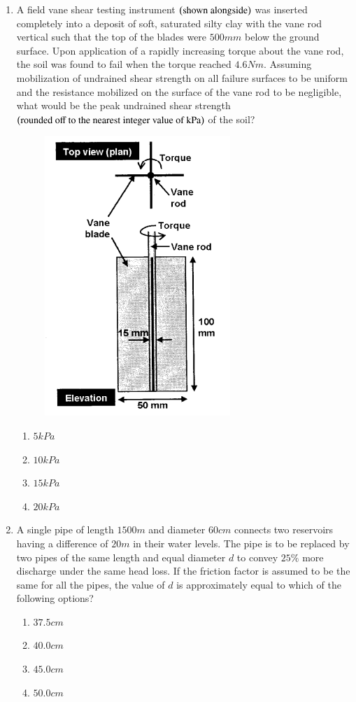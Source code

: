 \documentclass[journal,12pt,onecolumn]{IEEEtran}
\theoremstyle{remark}
\begin{document}
\begin{enumerate}
\item A field vane shear testing instrument $\left(\text{shown alongside}\right)$ was inserted completely into a deposit of soft, saturated silty clay with the vane rod vertical such that the top of the blades were $500mm$ below the ground surface. Upon application of a rapidly increasing torque about the vane rod, the soil was found to fail when the torque reached $4.6Nm$. Assuming mobilization of undrained shear strength on all failure surfaces to be uniform and the resistance mobilized on the surface of the vane rod to be negligible, what would be the peak undrained shear strength $\left(\text{rounded off to the nearest integer value of kPa}\right)$ of the soil?

\hfill{}
\begin{figure}[H]
\centering
\includegraphics[width=0.25\columnwidth]{figs/q38.png}
\caption*{}
\label{fig:Q.38}
\end{figure}
\begin{enumerate}
\item $5 kPa$
\item $10 kPa$
\item $15 kPa$
\item $20 kPa$
\end{enumerate}

\item A single pipe of length $1500m$ and diameter $60cm$ connects two reservoirs having a difference of $20m$ in their water levels. The pipe is to be replaced by two pipes of the same length and equal diameter $d$ to convey $25\%$ more discharge under the same head loss. If the friction factor is assumed to be the same for all the pipes, the value of $d$ is approximately equal to which of the following options?

\hfill{}
\begin{enumerate}
\item $37.5cm$
\item $40.0cm$
\item $45.0cm$
\item $50.0cm$
\end{enumerate}


\end{enumerate}
\end{document}
